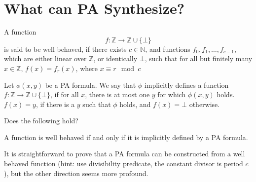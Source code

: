 \documentclass{article}
\begin{document}
\section{What can PA Synthesize?}
\begin{definition}
A function $$f: \mathbb{Z} \rightarrow \mathbb{Z} \cup \{\bot\}$$ is said to be well behaved, if there exists $c \in \mathbb{N}$, and functions $f_0, f_1, \dots, f_{c-1}$, which are either linear over $\mathbb{Z}$, or identically $\bot$, such that for all but finitely many $x \in \mathbb{Z}$, $f(x) = f_r(x)$, where $x \equiv r \mod c$
\end{definition}

\begin{definition}
Let $\phi(x, y)$ be a PA formula. We say that $\phi$ implicitly defines a function $f: \mathbb{Z} \rightarrow \mathbb{Z} \cup \{\bot\}$, if for all $x$, there is at most one $y$ for which $\phi(x, y)$ holds. $f(x) = y$, if there is a $y$ such that $\phi$ holds, and $f(x) = \bot$ otherwise.
\end{definition}

\begin{question}
Does the following hold?

A function is well behaved if and only if it is implicitly defined by a PA formula.
\end{question}

It is straightforward to prove that a PA formula can be constructed from a well behaved function (hint: use divisibility predicate, the constant divisor is period $c$), but the other direction seems more profound.
\end{document}

